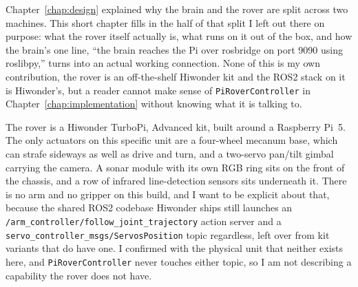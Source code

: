\label{chap:hardware}


Chapter~\ref{chap:design} explained why the brain and the rover are split
across two machines. This short chapter fills in the half of that split I
left out there on purpose: what the rover itself actually is, what runs on
it out of the box, and how the brain's one line, ``the brain reaches the
Pi over rosbridge on port 9090 using roslibpy,'' turns into an actual
working connection. None of this is my own contribution, the rover is an
off-the-shelf Hiwonder kit and the ROS2 stack on it is Hiwonder's, but a
reader cannot make sense of \texttt{PiRoverController} in
Chapter~\ref{chap:implementation} without knowing what it is talking to.

\label{sec:turbopi_platform}

The rover is a Hiwonder TurboPi, Advanced kit, built around a Raspberry
Pi~5. The only actuators on this specific unit are a four-wheel mecanum
base, which can strafe sideways as well as drive and turn, and a
two-servo pan/tilt gimbal carrying the camera. A sonar module with its own
RGB ring sits on the front of the chassis, and a row of infrared
line-detection sensors sits underneath it. There is no arm and no
gripper on this build, and I want to be explicit about that, because the
shared ROS2 codebase Hiwonder ships still launches an
\texttt{/arm\_controller/follow\_joint\_trajectory} action server and a
\texttt{servo\_controller\_msgs/ServosPosition} topic regardless, left
over from kit variants that do have one. I confirmed with the physical
unit that neither exists here, and \texttt{PiRoverController} never
touches either topic, so I am not describing a capability the rover does
not have.

